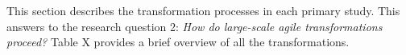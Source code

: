 This section describes the transformation processes in each primary
study. This answers to the research question 2: \textit{How do
large-scale agile transformations proceed?} Table X provides a brief
overview of all the transformations.

\bigskip

\bigskip
